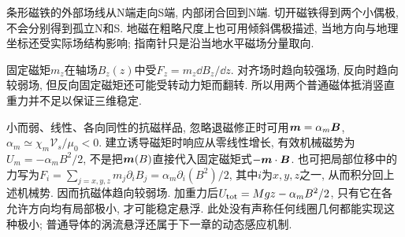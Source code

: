 条形磁铁的外部场线从N端走向S端, 内部闭合回到N端. 切开磁铁得到两个小偶极, 不会分别得到孤立N和S. 地磁在粗略尺度上也可用倾斜偶极描述, 当地方向与地理坐标还受实际场结构影响; 指南针只是沿当地水平磁场分量取向.

固定磁矩$m_z$在轴场$B_z(z)$中受$F_z=m_z\dd B_z/\dd z$. 对齐场时趋向较强场, 反向时趋向较弱场, 但反向固定磁矩还可能受转动力矩而翻转. 所以用两个普通磁体抵消竖直重力并不足以保证三维稳定.

小而弱、线性、各向同性的抗磁样品, 忽略退磁修正时可用$\boldsymbol{m}=\alpha_m\boldsymbol{B}$, $\alpha_m\simeq\chi_m\mathcal V_s/\mu_0<0$. 建立诱导磁矩时响应从零线性增长, 有效机械磁势为$U_m=-\alpha_mB^2/2$, 不是把$\boldsymbol{m}(B)$直接代入固定磁矩式$-\boldsymbol{m}\cdot\boldsymbol{B}$. 也可把局部位移中的力写为$F_i=\sum_{j=x,y,z}m_j\partial_iB_j=\alpha_m\partial_i(B^2)/2$, 其中$i$为$x,y,z$之一, 从而积分回上述机械势. 因而抗磁体趋向较弱场. 加重力后$U_{\rm tot}=Mgz-\alpha_mB^2/2$, 只有它在各允许方向均有局部极小, 才可能稳定悬浮. 此处没有声称任何线圈几何都能实现这种极小; 普通导体的涡流悬浮还属于下一章的动态感应机制.

